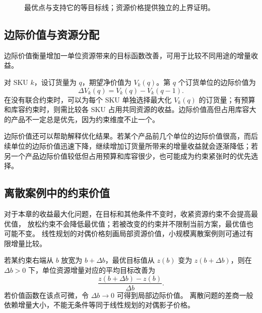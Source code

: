 \begin{figure}[htbp]
\centering
{}
\caption{最优点与支持它的等目标线；资源价格提供独立的上界证明。}
\end{figure}

\subsection{边际价值与资源分配}

边际价值衡量增加一单位资源带来的目标函数改善，可用于比较不同用途的增量收益。

对 SKU \(k\)，设订货量为 \(q\)，期望净价值为 \(V_k(q)\)。第 \(q\) 个订货单位的边际价值为
\[
  \Delta V_k(q)=V_k(q)-V_k(q-1).
\]
在没有联合约束时，可以为每个 SKU 单独选择最大化 \(V_k(q)\) 的订货量；有预算和库容约束时，则需比较各 SKU 占用共同资源的收益。边际价值高但占用库容大的产品不一定总是优先，因为约束维度不止一个。

边际价值还可以帮助解释优化结果。若某个产品前几个单位的边际价值很高，而后续单位的边际价值迅速下降，继续增加订货量所带来的增量收益就会逐渐降低；若另一个产品边际价值较低但占用预算和库容很少，也可能成为约束紧张时的优先选择。

\subsection{离散案例中的约束价值}

对于本章的收益最大化问题，在目标和其他条件不变时，收紧资源约束不会提高最优值，
放松约束不会降低最优值；若被改变的约束并不限制当前方案，最优值也可能不变。
线性规划的对偶价格刻画局部资源价值，小规模离散案例则可通过有限增量比较。

\begin{definition}[资源增量价值]
若某约束右端从 \(b\) 放宽为 \(b+\Delta b\)，最优目标值从 \(z(b)\) 变为 \(z(b+\Delta b)\)，则在 \(\Delta b>0\) 下，单位资源增量对应的平均目标改善为
\[
  \frac{z(b+\Delta b)-z(b)}{\Delta b}.
\]
若价值函数在该点可微，令 \(\Delta b\to0\) 可得到局部边际价值。
离散问题的差商一般依赖增量大小，不能无条件等同于线性规划的对偶影子价格。
\end{definition}


